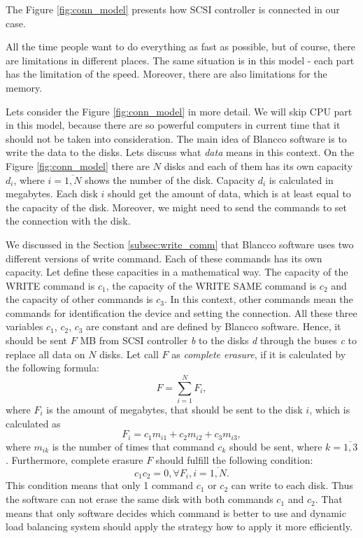 The Figure \ref{fig:conn_model} presents how SCSI controller is connected in our case.  

All the time people want to do everything as fast as possible, but of course, there are limitations in different places. The same situation is in this model - each part has the limitation of the speed. Moreover, there are also limitations for the memory.


Lets consider the Figure \ref{fig:conn_model} in more detail. We will skip CPU part in this model, because there are so powerful computers in current time that it should not be taken into consideration. The main idea of Blancco software is to write the data to the disks. Lets discuss what \emph{data} means in this context. On the Figure \ref{fig:conn_model} there are $N$ disks and each of them has its own capacity $d_i$, where $i=\overline{1,N}$ shows the number of the disk. Capacity $d_i$ is calculated in megabytes. Each disk $i$ should get the amount of data, which is at least equal to the capacity of the disk. Moreover, we might need to send the commands to set the connection with the disk. 


We discussed in the Section \ref{subsec:write_comm} that Blancco software uses two different versions of write command. Each of these commands has its own capacity. Let define these capacities in a mathematical way. The capacity of the WRITE command is $c_1$, the capacity of the WRITE SAME command is $c_2$ and the capacity of other commands is $c_3$. In this context, other commands mean the commands for identification the device and setting the connection. All these three variables $c_1$, $c_2$, $c_3$ are constant and are defined by Blancco software. Hence, it should be sent $F$ MB from SCSI controller \emph{b} to the disks \emph{d} through the buses \emph{c} to replace all data on $N$ disks. Let call $F$ as \emph{complete erasure}, if it is calculated by the following formula:
\begin{equation}
\label{eq:comp_erasure}
	F = \sum_{i=1}^{N}F_i,
\end{equation}
where $F_i$ is the amount of megabytes, that should be sent to the disk $i$, which is calculated as
\begin{equation}
	F_i = c_1 m_{i1} + c_2 m_{i2} + c_3 m_{i3},
\end{equation}
where $m_{ik}$ is the number of times that command $c_k$ should be sent, where $k=\overline{1,3}$. Furthermore, complete erasure $F$ should fulfill the following condition:
\begin{equation}
\label{eq:write_cond}
	c_1 c_2 = 0, \forall F_i, i=\overline{1,N}.
\end{equation}
This condition means that only 1 command $c_1$ or $c_2$ can write to each disk. Thus the software can not erase the same disk with both commands $c_1$ and $c_2$. That means that only software decides which command is better to use and dynamic load balancing system should apply the strategy how to apply it more efficiently.



